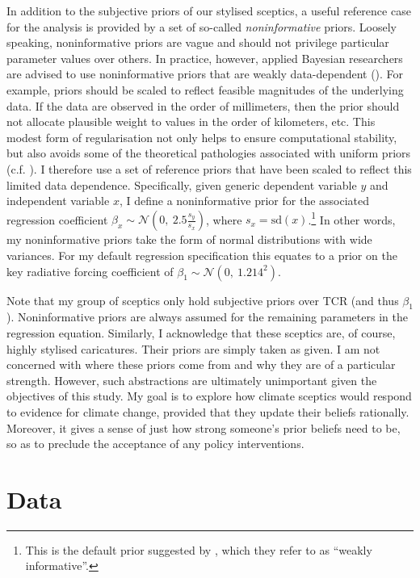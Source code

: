 \documentclass[smallextended]{svjour3}       %
\begin{document}
In addition to the subjective priors of our stylised sceptics, a useful
reference case for the analysis is provided by a set of so-called
\emph{noninformative} priors. Loosely speaking, noninformative priors
are vague and should not privilege particular parameter values over
others. In practice, however, applied Bayesian researchers are advised
to use noninformative priors that are weakly data-dependent
(\cite{gelman2020regression}). For example, priors should be scaled to
reflect feasible magnitudes of the underlying data. If the data are
observed in the order of millimeters, then the prior should not allocate
plausible weight to values in the order of kilometers, etc. This modest
form of regularisation not only helps to ensure computational stability,
but also avoids some of the theoretical pathologies associated with
uniform priors (c.f. \cite{annan2009probabilistic}). I therefore use a
set of reference priors that have been scaled to reflect this limited
data dependence. Specifically, given generic dependent variable \(y\)
and independent variable \(x\), I define a noninformative prior for the
associated regression coefficient
\(\beta_x \sim \mathcal{N}(0, \ 2.5 \frac{s_y}{s_x})\), where
\(s_x = \text{sd}(x)\).\footnote{This is the default prior suggested by
  \cite{rstanarm}, which they refer to as ``weakly informative''.} In
other words, my noninformative priors take the form of normal
distributions with wide variances. For my default regression
specification this equates to a prior on the key radiative forcing
coefficient of \(\beta_1 \sim \mathcal{N}(0, \ 1.214^2)\).

Note that my group of sceptics only hold subjective priors over TCR (and
thus \(\beta_1\)). Noninformative priors are always assumed for the
remaining parameters in the regression equation. Similarly, I
acknowledge that these sceptics are, of course, highly stylised
caricatures. Their priors are simply taken as given. I am not concerned
with where these priors come from and why they are of a particular
strength. However, such abstractions are ultimately unimportant given
the objectives of this study. My goal is to explore how climate sceptics
would respond to evidence for climate change, provided that they update
their beliefs rationally. Moreover, it gives a sense of just how strong
someone's prior beliefs need to be, so as to preclude the acceptance of
any policy interventions.

\hypertarget{sec:data}{%
\section{Data}\label{sec:data}}
\end{document}
